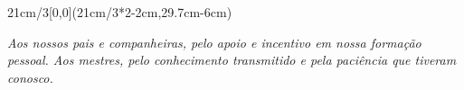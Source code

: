 \begin{textblock*}{21cm/3}[0,0](21cm/3*2-2cm,29.7cm-6cm)
  \begin{flushright}
    {\emph{
           Aos nossos pais e companheiras, pelo apoio e incentivo em nossa formação pessoal. Aos mestres, pelo conhecimento transmitido e pela paciência que tiveram conosco.
          }
    }
  \end{flushright}
\end{textblock*}

\null\newpage

